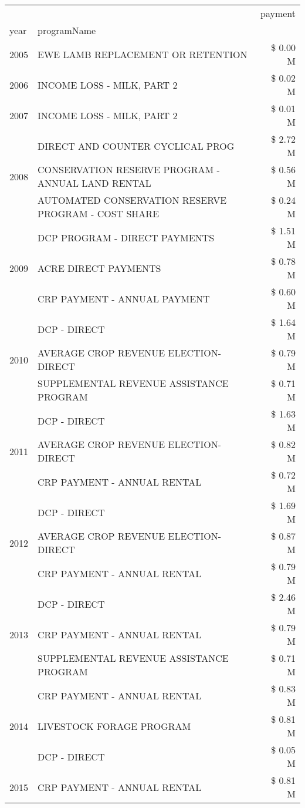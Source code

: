 \begin{tabular}{llr}
\toprule
 &  & payment \\
year & programName &  \\
\midrule
2005 & EWE LAMB REPLACEMENT OR RETENTION & \$ 0.00 M \\
\cline{1-3}
2006 & INCOME LOSS - MILK, PART 2 & \$ 0.02 M \\
\cline{1-3}
2007 & INCOME LOSS - MILK, PART 2 & \$ 0.01 M \\
\cline{1-3}
\multirow[t]{3}{*}{2008} & DIRECT AND COUNTER CYCLICAL PROG & \$ 2.72 M \\
 & CONSERVATION RESERVE PROGRAM - ANNUAL LAND RENTAL & \$ 0.56 M \\
 & AUTOMATED CONSERVATION RESERVE PROGRAM - COST SHARE & \$ 0.24 M \\
\cline{1-3}
\multirow[t]{3}{*}{2009} & DCP PROGRAM - DIRECT PAYMENTS & \$ 1.51 M \\
 & ACRE DIRECT PAYMENTS & \$ 0.78 M \\
 & CRP PAYMENT - ANNUAL PAYMENT & \$ 0.60 M \\
\cline{1-3}
\multirow[t]{3}{*}{2010} & DCP - DIRECT & \$ 1.64 M \\
 & AVERAGE CROP REVENUE ELECTION-DIRECT & \$ 0.79 M \\
 & SUPPLEMENTAL REVENUE ASSISTANCE PROGRAM & \$ 0.71 M \\
\cline{1-3}
\multirow[t]{3}{*}{2011} & DCP - DIRECT & \$ 1.63 M \\
 & AVERAGE CROP REVENUE ELECTION-DIRECT & \$ 0.82 M \\
 & CRP PAYMENT - ANNUAL RENTAL & \$ 0.72 M \\
\cline{1-3}
\multirow[t]{3}{*}{2012} & DCP - DIRECT & \$ 1.69 M \\
 & AVERAGE CROP REVENUE ELECTION-DIRECT & \$ 0.87 M \\
 & CRP PAYMENT - ANNUAL RENTAL & \$ 0.79 M \\
\cline{1-3}
\multirow[t]{3}{*}{2013} & DCP - DIRECT & \$ 2.46 M \\
 & CRP PAYMENT - ANNUAL RENTAL & \$ 0.79 M \\
 & SUPPLEMENTAL REVENUE ASSISTANCE PROGRAM & \$ 0.71 M \\
\cline{1-3}
\multirow[t]{3}{*}{2014} & CRP PAYMENT - ANNUAL RENTAL & \$ 0.83 M \\
 & LIVESTOCK FORAGE PROGRAM & \$ 0.81 M \\
 & DCP - DIRECT & \$ 0.05 M \\
\cline{1-3}
\multirow[t]{3}{*}{2015} & CRP PAYMENT - ANNUAL RENTAL & \$ 0.81 M \\

\end{tabular}
